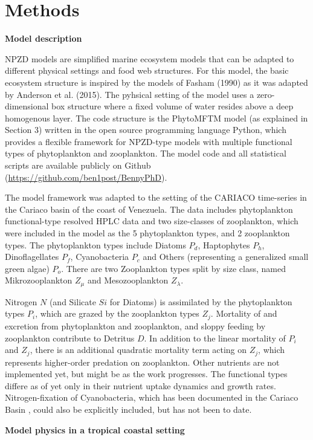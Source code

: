 \section{Methods}

{\bf {Model description}} 

NPZD models are simplified marine ecosystem models that can be adapted to different physical settings and food web structures. For this model, the basic ecosystem structure is inspired by the models of Fasham (1990) as it was adapted by Anderson et al. (2015). The pyhsical setting of the model uses a zero-dimensional box structure where a fixed volume of water resides above a deep homogenous layer. The code structure is the PhytoMFTM model (as explained in Section 3) written in the open source programming language Python, which provides a flexible framework for NPZD-type models with multiple functional types of phytoplankton and zooplankton. The model code and all statistical scripts are available publicly on Github (\url{https://github.com/ben1post/BennyPhD}).

The model framework was adapted to the setting of the CARIACO time-series in the Cariaco basin of the coast of Venezuela. The data includes phytoplankton functional-type resolved HPLC data and two size-classes of zooplankton, which were included in the model as the 5 phytoplankton types, and 2 zooplankton types. The phytoplankton types include Diatoms $P_{d}$, Haptophytes $P_{h}$, Dinoflagellates $P_{f}$, Cyanobacteria $P_{c}$ and Others (representing a generalized small green algae) $P_{o}$. There are two Zooplankton types split by size class, named Mikrozooplankton $Z_{\mu}$ and Mesozooplankton $Z_{\lambda}$. 

Nitrogen $N$ (and Silicate $Si$ for Diatoms) is assimilated by the phytoplankton types $P_i$, which are grazed by the zooplankton types $Z_j$. Mortality of and excretion from phytoplankton and zooplankton, and sloppy feeding by zooplankton contribute to Detritus $D$. In addition to the linear mortality of $P_i$ and $Z_j$, there is an additional quadratic mortality term acting on $Z_j$, which represents higher-order predation on zooplankton. Other nutrients are not implemented yet, but might be as the work progresses. The functional types differe as of yet only in their nutrient uptake dynamics and growth rates. Nitrogen-fixation of Cyanobacteria, which has been documented in the Cariaco Basin \citep{Montes2013}, could also be explicitly included, but has not been to date. 

{\textbf{Model physics in a tropical coastal setting}}

